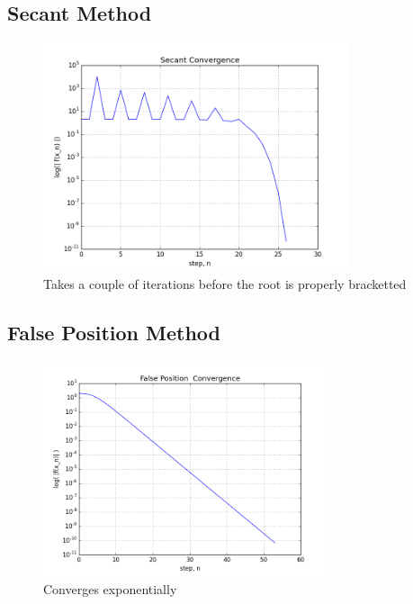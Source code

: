 \documentclass[12pt]{article}
\begin{document}
  \clearpage
  
  \subsection{Secant Method}
  
  \begin{figure}[h!]
    \centering
    \includegraphics[width=0.8\textwidth]{Problem4b.png}
    \caption{Takes a couple of iterations before the root is properly bracketted}
  \end{figure}


  \clearpage

  \subsection{False Position Method}
  
  \begin{figure}[h!]
    \centering
    \includegraphics[width=0.75\textwidth]{Problem4c.png}
    \caption{Converges exponentially}
  \end{figure}
\end{document}
